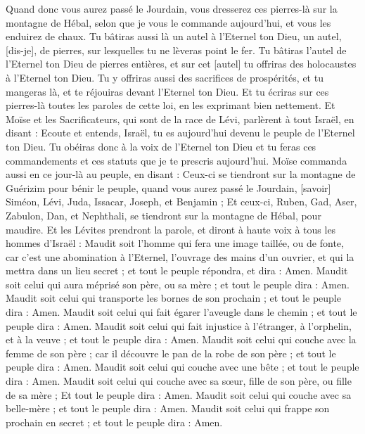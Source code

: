 \begin{multicols}{2}
Quand donc vous aurez passé le Jourdain, vous dresserez ces pierres-là sur la montagne de Hébal, selon que je vous le commande aujourd'hui, et vous les enduirez de chaux.
Tu bâtiras aussi là un autel à l'Eternel ton Dieu, un autel, [dis-je], de pierres, sur lesquelles tu ne lèveras point le fer.
Tu bâtiras l'autel de l'Eternel ton Dieu de pierres entières, et sur cet [autel] tu offriras des holocaustes à l'Eternel ton Dieu.
Tu y offriras aussi des sacrifices de prospérités, et tu mangeras là, et te réjouiras devant l'Eternel ton Dieu.
Et tu écriras sur ces pierres-là toutes les paroles de cette loi, en les exprimant bien nettement.
Et Moïse et les Sacrificateurs, qui sont de la race de Lévi, parlèrent à tout Israël, en disant : Ecoute et entends, Israël, tu es aujourd'hui devenu le peuple de l'Eternel ton Dieu.
Tu obéiras donc à la voix de l'Eternel ton Dieu et tu feras ces commandements et ces statuts que je te prescris aujourd'hui.
Moïse commanda aussi en ce jour-là au peuple, en disant :
Ceux-ci se tiendront sur la montagne de Guérizim pour bénir le peuple, quand vous aurez passé le Jourdain, [savoir] Siméon, Lévi, Juda, Issacar, Joseph, et Benjamin ;
Et ceux-ci, Ruben, Gad, Aser, Zabulon, Dan, et Nephthali, se tiendront sur la montagne de Hébal, pour maudire.
Et les Lévites prendront la parole, et diront à haute voix à tous les hommes d'Israël :
Maudit soit l'homme qui fera une image taillée, ou de fonte, car c'est une abomination à l'Eternel, l'ouvrage des mains d'un ouvrier, et qui la mettra dans un lieu secret ; et tout le peuple répondra, et dira : Amen.
Maudit soit celui qui aura méprisé son père, ou sa mère ; et tout le peuple dira : Amen.
Maudit soit celui qui transporte les bornes de son prochain ; et tout le peuple dira : Amen.
Maudit soit celui qui fait égarer l'aveugle dans le chemin ; et tout le peuple dira : Amen.
Maudit soit celui qui fait injustice à l'étranger, à l'orphelin, et à la veuve ; et tout le peuple dira : Amen.
Maudit soit celui qui couche avec la femme de son père ; car il découvre le pan de la robe de son père ; et tout le peuple dira : Amen.
Maudit soit celui qui couche avec une bête ; et tout le peuple dira : Amen.
Maudit soit celui qui couche avec sa sœur, fille de son père, ou fille de sa mère ; Et tout le peuple dira : Amen.
Maudit soit celui qui couche avec sa belle-mère ; et tout le peuple dira : Amen.
Maudit soit celui qui frappe son prochain en secret ; et tout le peuple dira : Amen.

\end{multicols}
